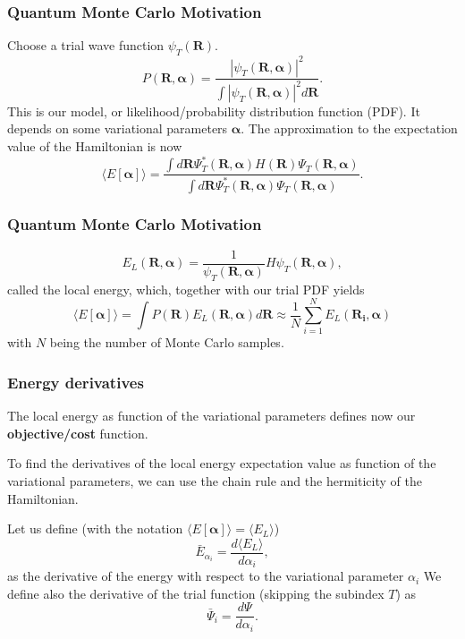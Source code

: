 \documentclass[11pt]{beamer} %
\begin{document}
\begin{frame}
\frametitle{Quantum Monte Carlo Motivation}

Choose a trial wave function
$\psi_T(\mathbf{R})$.
\[
   P(\mathbf{R},\mathbf{\alpha})= \frac{\left|\psi_T(\mathbf{R},\mathbf{\alpha})\right|^2}{\int \left|\psi_T(\mathbf{R},\mathbf{\alpha})\right|^2d\mathbf{R}}.
\]
This is our model, or likelihood/probability distribution function  (PDF). It depends on some variational parameters $\mathbf{\alpha}$.
The approximation to the expectation value of the Hamiltonian is now 
\[
   \langle E[\mathbf{\alpha}] \rangle = 
   \frac{\int d\mathbf{R}\Psi^{\ast}_T(\mathbf{R},\mathbf{\alpha})H(\mathbf{R})\Psi_T(\mathbf{R},\mathbf{\alpha})}
        {\int d\mathbf{R}\Psi^{\ast}_T(\mathbf{R},\mathbf{\alpha})\Psi_T(\mathbf{R},\mathbf{\alpha})}.
\]
\end{frame}

\begin{frame}
\frametitle{Quantum Monte Carlo Motivation}

\[
   E_L(\mathbf{R},\mathbf{\alpha})=\frac{1}{\psi_T(\mathbf{R},\mathbf{\alpha})}H\psi_T(\mathbf{R},\mathbf{\alpha}),
\]
called the local energy, which, together with our trial PDF yields
\[
  \langle E[\mathbf{\alpha}] \rangle=\int P(\mathbf{R})E_L(\mathbf{R},\mathbf{\alpha}) d\mathbf{R}\approx \frac{1}{N}\sum_{i=1}^NE_L(\mathbf{R_i},\mathbf{\alpha})
\]
with $N$ being the number of Monte Carlo samples.
\end{frame}

\begin{frame}
\frametitle{Energy derivatives}

The local energy as function of the variational parameters defines now our \textbf{objective/cost} function.

To find the derivatives of the local energy expectation value as function of the variational parameters, we can use the chain rule and the hermiticity of the Hamiltonian.  

Let us define (with the notation $\langle E[\mathbf{\alpha}]\rangle =\langle  E_L\rangle$)
\[
\bar{E}_{\alpha_i}=\frac{d\langle  E_L\rangle}{d\alpha_i},
\]
as the derivative of the energy with respect to the variational parameter $\alpha_i$
We define also the derivative of the trial function (skipping the subindex $T$) as 
\[
\bar{\Psi}_{i}=\frac{d\Psi}{d\alpha_i}.
\]
\end{frame}
\end{document}

